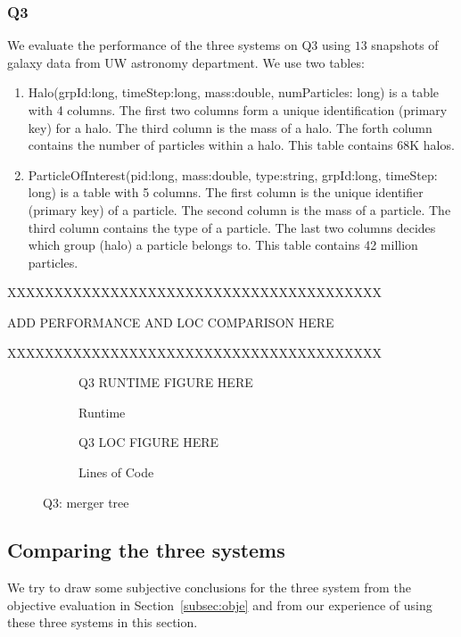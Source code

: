 \subsubsection{Q3}

We evaluate the performance of the three systems on Q3 using $13$ snapshots of 
galaxy data from UW astronomy department. We use two tables:

\begin{enumerate}
    \item Halo(grpId:long, timeStep:long, mass:double, numParticles: long) is 
    a table with 4 columns. The first two columns form a unique identification 
    (primary key) for a halo. The third column is the mass of a halo. The
    forth column contains the number of particles within a halo. This table 
    contains 68K halos.
    \item ParticleOfInterest(pid:long, mass:double, type:string, grpId:long, 
     timeStep: long) is a table with 5 columns. The first column is the unique
     identifier (primary key) of a particle. The second column is the mass of a
     particle. The third column contains the type of a particle. The last two 
     columns decides which group (halo) a particle belongs to. This table
     contains 42 million particles.
\end{enumerate}

XXXXXXXXXXXXXXXXXXXXXXXXXXXXXXXXXXXXXXXX

ADD PERFORMANCE AND LOC COMPARISON HERE

XXXXXXXXXXXXXXXXXXXXXXXXXXXXXXXXXXXXXXXX

\begin{figure}[t]
    \centering
    \begin{subfigure}{0.7\linewidth}
        Q3 RUNTIME FIGURE HERE
        \caption{Runtime}
        \label{fig:q3_runtime}
    \end{subfigure}
    \begin{subfigure}{0.7\linewidth}
        Q3 LOC FIGURE HERE
        \caption{Lines of Code}
        \label{fig:q3_loc}
    \end{subfigure}
\caption{Q3: merger tree}
\end{figure}

\subsection{Comparing the three systems}

We try to draw some subjective conclusions for 
the three system from the objective evaluation 
in Section~\ref{subsec:obje} and from our experience of using these three systems in this section.


